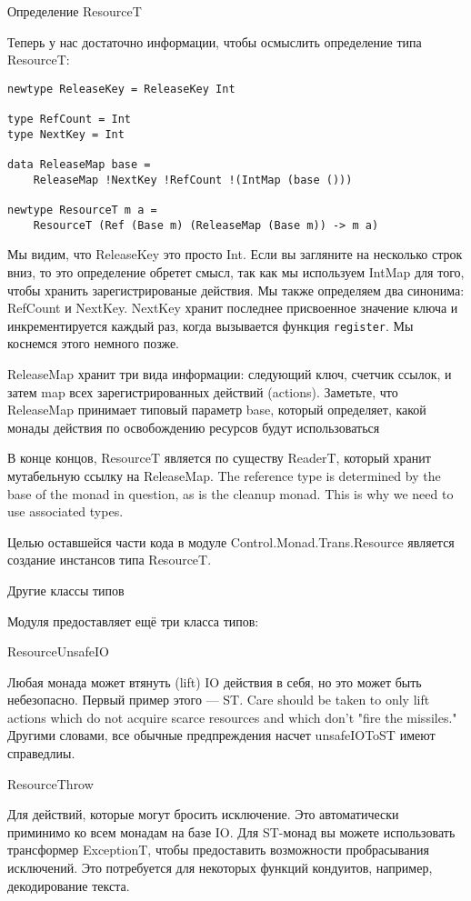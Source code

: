 Определение ResourceT

Теперь у нас достаточно информации, чтобы осмыслить определение типа ResourceT:
\begin{lstlisting}
newtype ReleaseKey = ReleaseKey Int

type RefCount = Int
type NextKey = Int

data ReleaseMap base =
    ReleaseMap !NextKey !RefCount !(IntMap (base ()))

newtype ResourceT m a =
    ResourceT (Ref (Base m) (ReleaseMap (Base m)) -> m a)
\end{lstlisting}
Мы видим, что ReleaseKey это просто Int. Если вы загляните на несколько строк вниз, то
это определение обретет смысл, так как мы используем IntMap для того, чтобы хранить
зарегистрированые действия. Мы также определяем два синонима: RefCount и NextKey. NextKey
хранит последнее присвоенное значение ключа и инкрементируется каждый раз, когда
вызывается функция \verb=register=. Мы коснемся этого немного позже.

ReleaseMap хранит три вида информации: следующий ключ, счетчик ссылок, и затем map всех
зарегистрированных действий (actions). Заметьте, что ReleaseMap принимает типовый
параметр base, который определяет, какой монады действия по освобождению ресурсов  будут
использоваться 

В конце концов, ResourceT является по существу ReaderT, который хранит мутабельную
ссылку на ReleaseMap. The reference type is determined by the base
of the monad in question, as is the cleanup monad. This is why we need to use associated
types.

Целью оставшейся части кода в модуле Control.Monad.Trans.Resource
является создание инстансов типа ResourceT.

Другие классы типов

Модуля предоставляет ещё три класса типов:
   
ResourceUnsafeIO

Любая монада может втянуть (lift) IO действия в себя, но это может быть небезопасно.
Первый пример этого --- ST. Care should be taken to
only lift actions which do not acquire scarce resources and which don't "fire the
missiles." Другими словами, все обычные предпреждения насчет unsafeIOToST имеют
справедлиы.
  
ResourceThrow

Для действий, которые могут бросить исключение.  Это автоматически приминимо ко всем
монадам на базе IO. Для ST-монад вы можете использовать трансформер ExceptionT, чтобы
предоставить возможности пробрасывания исключений. Это потребуется для некоторых функций
кондуитов, например, декодирование текста.
   

